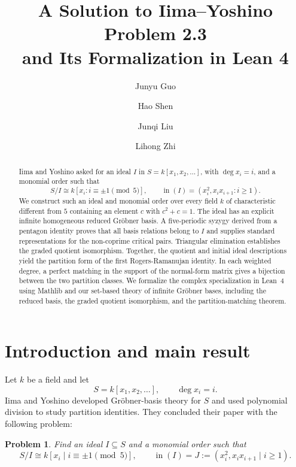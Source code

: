 \documentclass[11pt,reqno]{amsart}
\title[A  solution to Iima--Yoshino Problem 2.3]
{A Solution to Iima--Yoshino Problem 2.3\\
and Its Formalization in Lean 4}
\author{Junyu Guo}
\author{Hao Shen}
\author{Junqi Liu}
\author{Lihong Zhi}
\theoremstyle{definition}
\theoremstyle{remark}
\theoremstyle{plain}
\newtheorem{problem}[theorem]{Problem}
\newcommand{\inideal}{\operatorname{in}}
\begin{document}
\begin{abstract}
Iima and Yoshino asked for an ideal \(I\) in
\(S=k[x_1,x_2,\ldots]\), with \(\deg x_i=i\), and a monomial order
such that
\[
 S/I\cong k[x_i:i\equiv\pm1\pmod5],
 \qquad
 \operatorname{in}(I)=(x_i^2,x_ix_{i+1}:i\geq1).
\]
We construct such an ideal and monomial order over every field \(k\)
of characteristic different from \(5\) containing an element \(c\)
with \(c^2+c=1\). The ideal has an explicit infinite homogeneous
reduced Gr\"obner basis. A five-periodic syzygy derived from a
pentagon identity proves that all basis relations belong to \(I\)
and supplies standard representations for the non-coprime critical
pairs. Triangular elimination establishes the graded quotient
isomorphism. Together, the quotient and initial ideal descriptions
yield the partition form of the first Rogers-Ramanujan identity.
In each weighted degree, a perfect matching in the support of the
normal-form matrix gives a bijection between the two partition
classes. We formalize the complex specialization in Lean~4 using
Mathlib and our set-based theory of infinite Gr\"obner bases,
including the reduced basis, the graded quotient isomorphism,
and the partition-matching theorem.
\end{abstract}

\maketitle
\enlargethispage{3pt}

\section{Introduction and main result}\label{sec:introduction}

Let \(k\) be a field and let
\begin{equation}\label{eq:ring}
  S=k[x_1,x_2,\ldots],\qquad \deg x_i=i.
\end{equation}
Iima and Yoshino developed Gr\"obner-basis theory for \(S\) and used
polynomial division to study partition identities.  They concluded
their paper with the following problem:

\begin{problem}\cite[Problem~2.3]{IimaYoshino2009} \label{prob:IY}
Find an ideal \(I\subseteq S\) and a monomial order such that
\begin{equation}\label{eq:IYproblem}
  S/I\cong k[x_i\mid i\equiv\pm1\pmod 5],
  \qquad
  \inideal(I)=J:=(x_i^2,x_ix_{i+1}\mid i\geq1).
\end{equation}
\end{problem}
\end{document}
